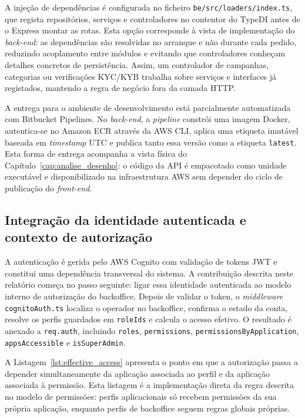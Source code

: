 A injeção de dependências é configurada no ficheiro \texttt{be/src/loaders/index.ts}, que regista repositórios, serviços e controladores no contentor do TypeDI antes de o Express montar as rotas. Esta opção corresponde à vista de implementação do \textit{back-end}: as dependências são resolvidas no arranque e não durante cada pedido, reduzindo acoplamento entre módulos e evitando que controladores conheçam detalhes concretos de persistência. Assim, um controlador de campanhas, categorias ou verificações KYC/KYB trabalha sobre serviços e interfaces já registados, mantendo a regra de negócio fora da camada HTTP.

A entrega para o ambiente de desenvolvimento está parcialmente automatizada com Bitbucket Pipelines. No \textit{back-end}, a \textit{pipeline} constrói uma imagem Docker, autentica-se no Amazon ECR através da AWS CLI, aplica uma etiqueta imutável baseada em \textit{timestamp} UTC e publica tanto essa versão como a etiqueta \texttt{latest}. Esta forma de entrega acompanha a vista física do Capítulo~\ref{cap:analise_desenho}: o código da \gls{API} é empacotado como unidade executável e disponibilizado na infraestrutura AWS sem depender do ciclo de publicação do \textit{front-end}.

\subsection{Integração da identidade autenticada e contexto de autorização}
\label{sec:autenticacao_impl}

A autenticação é gerida pelo AWS Cognito com validação de tokens JWT e constitui uma dependência transversal do sistema. A contribuição descrita neste relatório começa no passo seguinte: ligar essa identidade autenticada ao modelo interno de autorização do backoffice. Depois de validar o token, o \textit{middleware} \texttt{cognitoAuth.ts} localiza o operador no backoffice, confirma o estado da conta, resolve os perfis guardados em \texttt{roleIds} e calcula o acesso efetivo. O resultado é anexado a \texttt{req.auth}, incluindo \texttt{roles}, \texttt{permissions}, \texttt{permissionsByApplication}, \texttt{appsAccessible} e \texttt{isSuperAdmin}.

A Listagem~\ref{lst:effective_access} apresenta o ponto em que a autorização passa a depender simultaneamente da aplicação associada ao perfil e da aplicação associada à permissão. Esta listagem é a implementação direta da regra descrita no modelo de permissões: perfis aplicacionais só recebem permissões da sua própria aplicação, enquanto perfis de backoffice seguem regras globais próprias.


